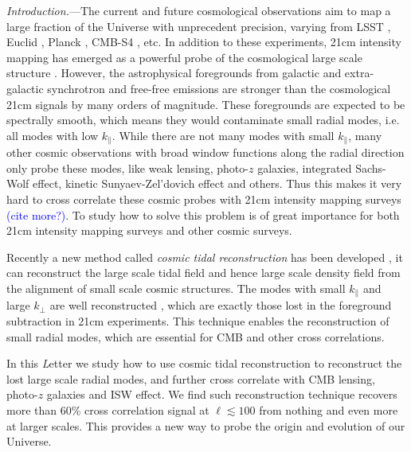 \documentclass[aps,prl,twocolumn,showpacs,superscriptaddress,groupedaddress,nofootinbib]{revtex4}  %
\newcommand{\tcb}{\textcolor{blue}}
\begin{document}
\pacs{}
\maketitle

{\it Introduction.}---The current and future cosmological observations aim
to map a large fraction of the Universe with unprecedent precision, varying
from LSST \cite{2009:lsst}, Euclid \cite{2011:euclid}\cite{2012:euclid}, 
Planck \cite{2015arXiv150201582P}, CMB-S4 \cite{2014ApJ...788..138W}\cite{2013arXiv1309.5383A}, etc. 
In addition to these
experiments, 21cm intensity mapping has emerged as a powerful probe of the 
cosmological large scale structure \cite{2008:21cm}\cite{chang}.
However, the astrophysical foregrounds from galactic and extra-galactic
synchrotron and free-free emissions are stronger than the cosmological 21cm 
signals by many orders of magnitude. These foregrounds are expected to be 
spectrally smooth, which means they would contaminate small radial
modes, i.e. all modes with low $k_\parallel$.
While there are not many modes with small $k_\parallel$, many other cosmic
observations with broad window functions along the radial direction only 
probe these modes, like weak lensing, photo-$z$ galaxies, 
integrated Sachs-Wolf effect, kinetic Sunyaev-Zel'dovich effect and others.  
Thus this makes it very hard to cross correlate these cosmic probes with 
21cm intensity mapping surveys 
\cite{2007ApJ...660.1030F}\cite{2008MNRAS.384..291A} \tcb{(cite more?)}. 
To study how to solve this problem is of great importance for both 21cm 
intensity mapping surveys and other cosmic surveys.

Recently a new method called {\it cosmic tidal reconstruction} has been 
developed \cite{2012:pen}\cite{2015:zhu}, it can reconstruct the large scale 
tidal field and hence large scale density field from the alignment of small 
scale cosmic structures.
The modes with small $k_\parallel$ and large $k_\perp$ are well 
reconstructed \cite{2015:zhu}, which are exactly those lost in the foreground 
subtraction in 21cm experiments. 
This technique enables the reconstruction of small radial modes, which are 
essential for CMB and other cross correlations.

In this {\emph Letter} we study how to use cosmic tidal reconstruction to 
reconstruct the lost large scale radial modes, and further cross correlate with
CMB lensing, photo-$z$ galaxies and ISW effect. 
We find such reconstruction technique recovers more than 60\% cross correlation 
signal at $\ell\lesssim100$ from nothing and even more at larger scales. 
This provides a new way to probe the origin and evolution of our Universe.
\end{document}
